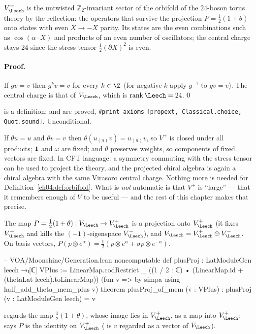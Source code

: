 \begin{physics}
$V_\Leech^+$ is the untwisted $\mathbb Z_2$-invariant sector of the orbifold of the $24$-boson torus theory by the reflection: the operators that survive the projection $P=\tfrac12(1+\theta)$ onto states with even $X\to-X$ parity. Its states are the even combinations such as $\cos(\alpha\cdot X)$ and products of an even number of oscillators; the central charge stays $24$ since the stress tensor $\tfrac12(\partial X)^2$ is even.
\end{physics}

\paragraph{Proof.} If $gv=v$ then $g^kv=v$ for every $k\in\Z$ (for negative $k$ apply $g^{-1}$ to
$gv=v$). The central charge is that of $V_\Leech$, which is $\operatorname{rank}\Leech=24$.\qed

\begin{status}
 is a definition;  and
 are proved, \texttt{\#print axioms}
\texttt{[propext, Classical.choice, Quot.sound]}. Unconditional.
\end{status}

\begin{remark}
If $\theta u=u$ and $\theta v=v$ then $\theta(u_{(n)}v)=u_{(n)}v$, so $V^+$ is closed under all
products; $\mathbf{1}$ and $\omega$ are fixed; and $\theta$ preserves weights, so components of fixed
vectors are fixed. In CFT language: a symmetry commuting with the stress tensor can be used to
project the theory, and the projected chiral algebra is again a chiral algebra with the same
Virasoro central charge. Nothing more is needed for Definition~\ref{ch04:def:orbifold}. What is
\emph{not} automatic is that $V^+$ is ``large'' --- that it remembers enough of $V$ to be useful
--- and the rest of this chapter makes that precise.
\end{remark}

\begin{remark}\label{ch04:rem:proj}
The map $P=\tfrac12(1+\theta):V_\Leech\to V_\Leech^+$ is a projection onto $V_\Leech^+$ (it fixes
$V_\Leech^+$ and kills the $(-1)$-eigenspace $V_\Leech^-$), and $V_\Leech=V_\Leech^+\oplus V_\Leech^-$. On
basis vectors, $P(p\otimes e^\alpha)=\tfrac12(p\otimes e^\alpha+\sigma p\otimes e^{-\alpha})$.
\begin{leancode}
-- VOA/Moonshine/Generation.lean
noncomputable def plusProj : LatModuleGen leech →ₗ[ℂ] VPlus :=
  LinearMap.codRestrict _ ((1 / 2 : ℂ) • (LinearMap.id + (thetaLat leech).toLinearMap))
    (fun v => by simpa using half_add_theta_mem_plus v)
theorem plusProj_of_mem (v : VPlus) : plusProj (v : LatModuleGen leech) = v
\end{leancode}
 regards the map $\tfrac12(1+\theta)$, whose image lies in $V_\Leech^+$,
as a map into $V_\Leech^+$;  says $P$ is the identity on $V_\Leech^+$
( is $v$ regarded as a vector of $V_\Leech$).
\end{remark}

